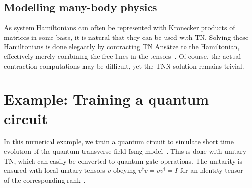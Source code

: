 \subsection{Modelling many-body physics}

As system Hamiltonians can often be represented with Kronecker products of matrices in some basis, it is natural that they can be used with TN. Solving these Hamiltonians is done elegantly by contracting TN Ansätze to the Hamiltonian, effectively merely combining the free lines in the tensors~\cite{Bridgeman_2017}. Of course, the actual contraction computations may be difficult, yet the TNN solution remains trivial.


\section{Example: Training a quantum circuit}

In this numerical example, we train a quantum circuit to simulate short time evolution of the quantum transverse field Ising model~\cite{Cervera-Lierta2018}. This is done with unitary TN, which can easily be converted to quantum gate operations. The unitarity is ensured with local unitary tensors $v$ obeying $v^\dagger v = vv^\dagger = I$ for an identity tensor of the corresponding rank~\cite{Haghshenas2021}.


